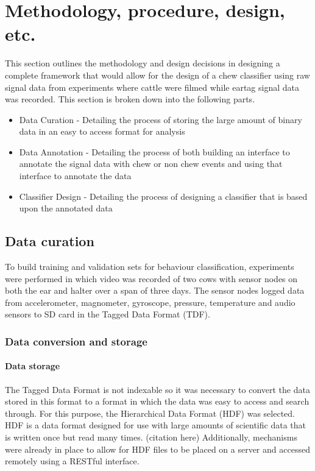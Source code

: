 \chapter{Methodology, procedure, design, etc.}

This section outlines the methodology and design decisions in designing a complete framework that would allow for the design of a chew classifier using raw signal data from experiments where cattle were filmed while eartag signal data was recorded. This section is broken down into the following parts.

\begin{itemize}
\item Data Curation - Detailing the process of storing the large amount of binary data in an easy to access format for analysis

\item Data Annotation - Detailing the process of both building an interface to annotate the signal data with chew or non chew events and using that interface to annotate the data

\item Classifier Design - Detailing the process of designing a classifier that is based upon the annotated data
\end{itemize}

\section{Data curation}

To build training and validation sets for behaviour classification, experiments were performed in which video was recorded of two cows with sensor nodes on both the ear and halter over a span of three days. The sensor nodes logged data from accelerometer, magnometer, gyroscope, pressure, temperature and audio sensors to SD card in the Tagged Data Format (TDF). 

\subsection{Data conversion and storage}

\subsubsection{Data storage}
\label{Data storage}
The Tagged Data Format is not indexable so it was necessary to convert the data stored in this format to a format in which the data was easy to access and search through. For this purpose, the Hierarchical Data Format (HDF) was selected. HDF is a data format designed for use with large amounts of scientific data that is written once but read many times. (citation here) Additionally, mechanisms were already in place to allow for HDF files to be placed on a server and accessed remotely using a RESTful interface. 

